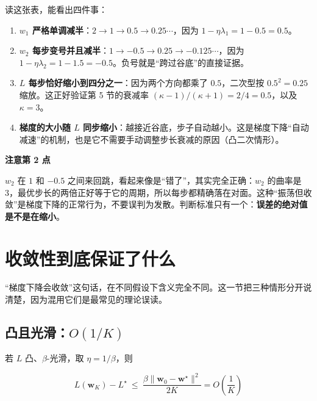 \documentclass[UTF8, a4paper, zihao=-4, fontset=none]{ctexart}
\begin{document}
读这张表，能看出四件事：



\begin{enumerate}
\item \textbf{$w_1$ 严格单调减半}：$2\to1\to0.5\to0.25\cdots$，因为 $1-\eta\lambda_1=1-0.5=0.5$。
\item \textbf{$w_2$ 每步变号并且减半}：$1\to-0.5\to0.25\to-0.125\cdots$，因为 $1-\eta\lambda_2=1-1.5=-0.5$。负号就是“跨过谷底”的直接证据。
\item \textbf{$L$ 每步恰好缩小到四分之一}：因为两个方向都乘了 $0.5$，二次型按 $0.5^2=0.25$ 缩放。这正好验证第 5 节的衰减率 $(\kappa-1)/(\kappa+1)=2/4=0.5$，以及 $\kappa=3$。
\item \textbf{梯度的大小随 $L$ 同步缩小}：越接近谷底，步子自动越小。这是梯度下降“自动减速”的机制，也是它不需要手动调整步长衰减的原因（凸二次情形）。
\end{enumerate}



\begin{infobox}
{\bfseries\sffamily\small\color{accent} 注意第 2 点}\par\vspace{2pt}
$w_2$ 在 $1$ 和 $-0.5$ 之间来回跳，看起来像是“错了”，其实完全正确：$w_2$ 的曲率是 3，最优步长的两倍正好等于它的周期，所以每步都精确落在对面。这种“振荡但收敛”是梯度下降的正常行为，不要误判为发散。判断标准只有一个：\textbf{误差的绝对值是不是在缩小}。


\end{infobox}




\section{收敛性到底保证了什么}



“梯度下降会收敛”这句话，在不同假设下含义完全不同。这一节把三种情形分开说清楚，因为混用它们是最常见的理论误读。




\subsection{凸且光滑：$O(1/K)$}



若 $L$ 凸、$\beta$-光滑，取 $\eta=1/\beta$，则


\[
L(\mathbf{w}_K)-L^\star\ \le\ \frac{\beta\|\mathbf{w}_0-\mathbf{w}^\star\|^2}{2K}=O\!\left(\frac{1}{K}\right)
\]
\end{document}
